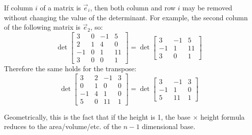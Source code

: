 \begin{applicationActivities}{2}{26}
\begin{fact}
If column $i$ of a matrix is $\vec{e}_i$, then both column and row $i$
may be removed without changing the value of the determinant.
For example, the second column of the following matrix is \(\vec e_2\), so:
\[
  \det \begin{bmatrix}
    3 & 0 & -1 & 5 \\
    2 & 1 & 4 & 0 \\
    -1 & 0 & 1 & 11 \\
    3 & 0 & 0 & 1
  \end{bmatrix} =
  \det \begin{bmatrix}
    3 & -1 & 5 \\
    -1 & 1 & 11 \\
    3 & 0 & 1
  \end{bmatrix}
\]
Therefore the same holds for the transpose:
\[
  \det \begin{bmatrix}
    3 & 2 & -1 & 3 \\
    0 & 1 & 0 & 0 \\
    -1 & 4 & 1 & 0 \\
    5 & 0 & 11 & 1
  \end{bmatrix} =
  \det \begin{bmatrix}
    3 & -1 & 3 \\
    -1 & 1 & 0 \\
    5 & 11 & 1
  \end{bmatrix}
\]

Geometrically, this is the fact that if the height is 1, the base $\times$ height formula reduces to the area/volume/etc. of the $n-1$ dimensional base.
\end{fact}


\end{applicationActivities}
